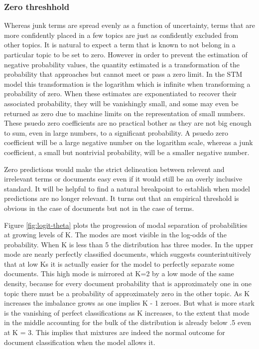 \documentclass[]{book}
\theoremstyle{definition}
\theoremstyle{definition}
\theoremstyle{definition}
\theoremstyle{remark}
\begin{document}
\hypertarget{zero-threshhold}{%
\subsubsection{Zero threshhold}\label{zero-threshhold}}

Whereas junk terms are spread evenly as a function of uncertainty, terms
that are more confidently placed in a few topics are just as confidently
excluded from other topics. It is natural to expect a term that is known
to not belong in a particular topic to be set to zero. However in order
to prevent the estimation of negative probability values, the quantity
estimated is a transformation of the probability that approaches but
cannot meet or pass a zero limit. In the STM model this transformation
is the logarithm which is infinite when transforming a probability of
zero. When these estimates are exponentiated to recover their associated
probability, they will be vanishingly small, and some may even be
returned as zero due to machine limits on the representation of small
numbers. These psuedo zero coefficients are no practical bother as they
are not big enough to sum, even in large numbers, to a significant
probability. A psuedo zero coefficient will be a large negative number
on the logarithm scale, whereas a junk coefficient, a small but
nontrivial probability, will be a smaller negative number.

Zero predictions would make the strict delineation between relevent and
irrelevant terms or documents easy even if it would still be an overly
inclusive standard. It will be helpful to find a natural breakpoint to
establish when model predictions are no longer relevant. It turns out
that an empirical threshold is obvious in the case of documents but not
in the case of terms.

Figure \ref{fig:logit-theta} plots the progression of modal separation
of probabilities at growing levels of K. The modes are most visible in
the log-odds of the probability. When K is less than 5 the distribution
has three modes. In the upper mode are nearly perfectly classified
documents, which suggests counterintuitively that at low Ks it is
actually easier for the model to perfectly separate some documents. This
high mode is mirrored at K=2 by a low mode of the same density, because
for every document probability that is approximately one in one topic
there must be a probability of approximately zero in the other topic. As
K increases the imbalance grows as one implies K - 1 zeroes. But what is
more stark is the vanishing of perfect classifications as K increases,
to the extent that mode in the middle accounting for the bulk of the
distribution is already below .5 even at K = 3. This implies that
mixtures are indeed the normal outcome for document classification when
the model allows it.
\end{document}
